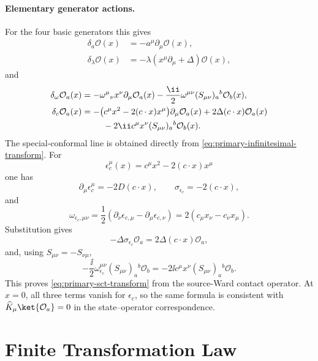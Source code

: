 \paragraph{Elementary generator actions.}
For the four basic generators this gives
\begin{align}
  \delta_a\mathcal O(x)&=-a^\mu\partial_\mu\mathcal O(x),\\
  \delta_\lambda\mathcal O(x)&=-\lambda(x^\mu\partial_\mu+\Delta)\mathcal O(x),
  \label{eq:primary-translation-dilatation-transform}
\end{align}
and
\begin{align}
  \delta_\omega\mathcal O_a(x)
  &=
  -\omega^\mu{}_\nu x^\nu\partial_\mu\mathcal O_a(x)
  -\frac{\ii}{2}\omega^{\mu\nu}(S_{\mu\nu})_a{}^b\mathcal O_b(x),
  \\
  \delta_c\mathcal O_a(x)
  &=
  -\bigl(c^\mu x^2-2(c\cdot x)x^\mu\bigr)
  \partial_\mu\mathcal O_a(x)
  +2\Delta(c\cdot x)\mathcal O_a(x)
  \notag\\
  &\hspace{2.5em}
  -2\ii c^\mu x^\nu(S_{\mu\nu})_a{}^b\mathcal O_b(x).
  \label{eq:primary-sct-transform}
\end{align}
The special-conformal line is obtained directly from
\eqref{eq:primary-infinitesimal-transform}.  For
\[
  \epsilon_c^\mu(x)=c^\mu x^2-2(c\cdot x)x^\mu
\]
one has
\[
  \partial_\mu\epsilon_c^\mu=-2D(c\cdot x),
  \qquad
  \sigma_{\epsilon_c}=-2(c\cdot x),
\]
and
\[
  \omega_{\epsilon_c,\mu\nu}
  =
  \frac12(\partial_\nu\epsilon_{c,\mu}-\partial_\mu\epsilon_{c,\nu})
  =
  2(c_\mu x_\nu-c_\nu x_\mu).
\]
Substitution gives
\[
  -\Delta\sigma_{\epsilon_c}\mathcal O_a
  =
  2\Delta(c\cdot x)\mathcal O_a,
\]
and, using \(S_{\mu\nu}=-S_{\nu\mu}\),
\[
  -\frac{\ii}{2}\omega_{\epsilon_c}^{\mu\nu}
  (S_{\mu\nu})_a{}^b\mathcal O_b
  =
  -2\ii c^\mu x^\nu(S_{\mu\nu})_a{}^b\mathcal O_b.
\]
This proves \eqref{eq:primary-sct-transform} from the source-Ward contact
operator.  At \(x=0\), all three terms vanish for \(\epsilon_c\), so the same
formula is consistent with \(\widehat K_\mu\ket{\mathcal O_a}=0\) in the
state--operator correspondence.

\section{Finite Transformation Law}

